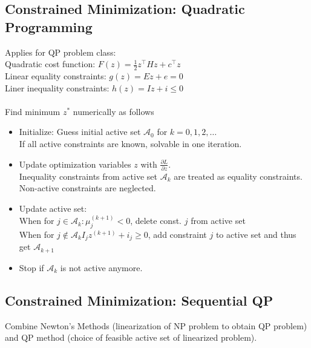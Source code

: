 \documentclass[english]{latex4ei/latex4ei_sheet}
\begin{document}
\begin{sectionbox}

\subsection{Constrained Minimization: Quadratic Programming}
Applies for QP problem class:\\
Quadratic cost function: $F(z)=\frac{1}{2}z^{\top}Hz+c^{\top}z$\\
Linear equality constraints: $g(z)=Ez+e=0$\\
Liner inequality constraints: $h(z)=Iz+i\leq 0$\\
\\
Find minimum $z^{*}$ numerically as follows
\begin{itemize}
    \item Initialize: Guess initial active set $\mathcal{A}_0$ for $k=0,1,2,\ldots$\\
    If all active constraints are known, solvable in one iteration.
    \item Update optimization variables $z$ with $\frac{\partial L}{\partial z}$.\\
    Inequality constraints from active set $\mathcal{A}_k$ are treated as equality constraints. Non-active constraints are neglected.
    \item Update active set:\\
    When for $j \in \mathcal{A}_{k}: \mu_{j}^{(k+1)}<0$, delete const. $j$ from active set\\
    When for $j \notin \mathcal{A}_{k} I_{j} z^{(k+1)}+i_{j} \geq 0$, add constraint $j$ to active set and thus get $\mathcal{A}_{k+1}$
    \item Stop if $\mathcal{A}_{k}$ is not active anymore.
\end{itemize}\vspace{0.2cm}

\subsection{Constrained Minimization: Sequential QP}
Combine Newton's Methods (linearization of NP problem to obtain QP problem) and QP method (choice of feasible active set of linearized problem).\\


\end{sectionbox}
\end{document}
